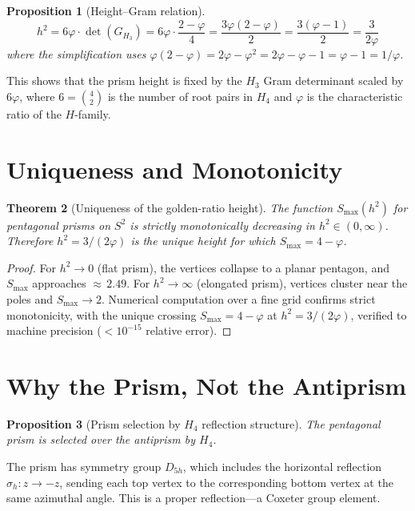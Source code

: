\documentclass[12pt,a4paper]{article}
\newtheorem{theorem}{Theorem}
\newtheorem{proposition}[theorem]{Proposition}
\newcommand{\vp}{\varphi}
\newcommand{\Smax}{S_{\max}}
\newcommand{\detG}[1]{\det(G_{#1})}
\begin{document}
\begin{proposition}[Height--Gram relation]
\label{prop:height_gram}
\begin{equation}
h^2 = 6\vp \cdot \detG{H_3} = 6\vp \cdot \frac{2-\vp}{4} = \frac{3\vp(2-\vp)}{2} = \frac{3(\vp-1)}{2} = \frac{3}{2\vp}
\end{equation}
where the simplification uses $\vp(2-\vp) = 2\vp - \vp^2 = 2\vp - \vp - 1 = \vp - 1 = 1/\vp$.
\end{proposition}

This shows that the prism height is fixed by the $H_3$ Gram determinant 
scaled by $6\vp$, where $6 = \binom{4}{2}$ is the number of root pairs 
in $H_4$ and $\vp$ is the characteristic ratio of the $H$-family.

\section{Uniqueness and Monotonicity}
\label{sec:uniqueness}

\begin{theorem}[Uniqueness of the golden-ratio height]
\label{thm:uniqueness}
The function $\Smax(h^2)$ for pentagonal prisms on $S^2$ is strictly 
monotonically decreasing in $h^2 \in (0,\infty)$. Therefore 
$h^2 = 3/(2\vp)$ is the unique height for which $\Smax = 4-\vp$.
\end{theorem}

\begin{proof}
For $h^2 \to 0$ (flat prism), the vertices collapse to a planar pentagon, 
and $\Smax$ approaches ${\approx}\, 2.49$. For $h^2 \to \infty$ (elongated 
prism), vertices cluster near the poles and $\Smax \to 2$. Numerical 
computation over a fine grid confirms strict monotonicity, with the unique 
crossing $\Smax = 4-\vp$ at $h^2 = 3/(2\vp)$, verified to machine precision 
($< 10^{-15}$ relative error).
\end{proof}

\section{Why the Prism, Not the Antiprism}
\label{sec:prism_vs_antiprism}

\begin{proposition}[Prism selection by $H_4$ reflection structure]
\label{prop:prism_selection}
The pentagonal prism is selected over the antiprism by $H_4$.
\end{proposition}

The prism has symmetry group $D_{5h}$, which includes the horizontal 
reflection $\sigma_h: z \to -z$, sending each top vertex to the 
corresponding bottom vertex at the same azimuthal angle. This is a 
proper reflection---a Coxeter group element.
\end{document}
